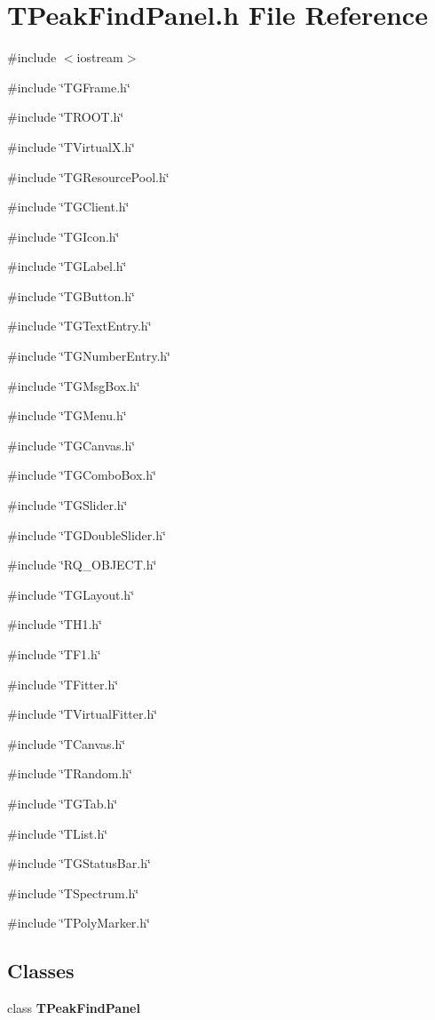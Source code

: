 \section{TPeakFindPanel.h File Reference}
\label{TPeakFindPanel_8h}
{\ttfamily \#include $<$iostream$>$}\par
{\ttfamily \#include \char`\"{}TGFrame.h\char`\"{}}\par
{\ttfamily \#include \char`\"{}TROOT.h\char`\"{}}\par
{\ttfamily \#include \char`\"{}TVirtualX.h\char`\"{}}\par
{\ttfamily \#include \char`\"{}TGResourcePool.h\char`\"{}}\par
{\ttfamily \#include \char`\"{}TGClient.h\char`\"{}}\par
{\ttfamily \#include \char`\"{}TGIcon.h\char`\"{}}\par
{\ttfamily \#include \char`\"{}TGLabel.h\char`\"{}}\par
{\ttfamily \#include \char`\"{}TGButton.h\char`\"{}}\par
{\ttfamily \#include \char`\"{}TGTextEntry.h\char`\"{}}\par
{\ttfamily \#include \char`\"{}TGNumberEntry.h\char`\"{}}\par
{\ttfamily \#include \char`\"{}TGMsgBox.h\char`\"{}}\par
{\ttfamily \#include \char`\"{}TGMenu.h\char`\"{}}\par
{\ttfamily \#include \char`\"{}TGCanvas.h\char`\"{}}\par
{\ttfamily \#include \char`\"{}TGComboBox.h\char`\"{}}\par
{\ttfamily \#include \char`\"{}TGSlider.h\char`\"{}}\par
{\ttfamily \#include \char`\"{}TGDoubleSlider.h\char`\"{}}\par
{\ttfamily \#include \char`\"{}RQ\_\-OBJECT.h\char`\"{}}\par
{\ttfamily \#include \char`\"{}TGLayout.h\char`\"{}}\par
{\ttfamily \#include \char`\"{}TH1.h\char`\"{}}\par
{\ttfamily \#include \char`\"{}TF1.h\char`\"{}}\par
{\ttfamily \#include \char`\"{}TFitter.h\char`\"{}}\par
{\ttfamily \#include \char`\"{}TVirtualFitter.h\char`\"{}}\par
{\ttfamily \#include \char`\"{}TCanvas.h\char`\"{}}\par
{\ttfamily \#include \char`\"{}TRandom.h\char`\"{}}\par
{\ttfamily \#include \char`\"{}TGTab.h\char`\"{}}\par
{\ttfamily \#include \char`\"{}TList.h\char`\"{}}\par
{\ttfamily \#include \char`\"{}TGStatusBar.h\char`\"{}}\par
{\ttfamily \#include \char`\"{}TSpectrum.h\char`\"{}}\par
{\ttfamily \#include \char`\"{}TPolyMarker.h\char`\"{}}\par
\subsection*{Classes}
\begin{DoxyCompactItemize}
\item 
class {\bf TPeakFindPanel}
\end{DoxyCompactItemize}
